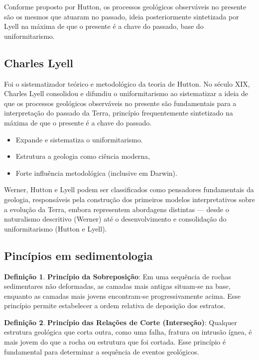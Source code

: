\documentclass[a4paper,12pt]{article}
\theoremstyle{definition}
\theoremstyle{definition}
\theoremstyle{definition}
\newtheorem{definicao}{Definição}[section]
\begin{document}
Conforme proposto por Hutton, os processos geológicos observáveis no presente são os mesmos que atuaram no passado, ideia posteriormente sintetizada por Lyell na máxima de que o presente é a chave do passado, base do uniformitarismo.

\subsection{Charles Lyell}
Foi o sistematizador teórico e metodológico da teoria de Hutton. No século XIX, Charles Lyell consolidou e difundiu o uniformitarismo ao sistematizar a ideia de que os processos geológicos observáveis no presente são fundamentais para a interpretação do passado da Terra, princípio frequentemente sintetizado na máxima de que o presente é a chave do passado.

\begin{itemize}[label=\diamond]
    \item Expande e sistematiza o uniformitarismo.
    \item Estrutura a geologia como ciência moderna,
    \item Forte influência metodológica (inclusive em Darwin).
\end{itemize}

Werner, Hutton e Lyell podem ser classificados como pensadores fundamentais da geologia, responsáveis pela construção dos primeiros modelos interpretativos sobre a evolução da Terra, embora representem abordagens distintas — desde o naturalismo descritivo (Werner) até o desenvolvimento e consolidação do uniformitarismo (Hutton e Lyell).

\subsection{Pincípios em sedimentologia}

\begin{definicao}
\textbf{Princípio da Sobreposição}: Em uma sequência de rochas sedimentares não deformadas, as camadas mais antigas situam-se na base, enquanto as camadas mais jovens encontram-se progressivamente acima. Esse princípio permite estabelecer a ordem relativa de deposição dos estratos.
\end{definicao}

\begin{definicao}
\textbf{Princípio das Relações de Corte (Interseção)}: Qualquer estrutura geológica que corta outra, como uma falha, fratura ou intrusão ígnea, é mais jovem do que a rocha ou estrutura que foi cortada. Esse princípio é fundamental para determinar a sequência de eventos geológicos.
\end{definicao}
\end{document}
